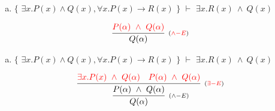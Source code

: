 \documentclass[aspectratio=43]{beamer}
\begin{document}
    \begin{frame}[fragile]
    
    	\begin{enumerate}[d)]
			\item $\{$ $\exists x.P(x)\land Q(x), \forall x.P(x)\to R(x)$ $\}$ $\vdash$ $\exists x.R(x)\ \land\ Q(x) $\\
		\end{enumerate}
        
        \vspace{70pt}
        
        \[
        \begin{array}{c}
		
        	\infer[_{(\textcolor{red}{\land -E})}] 
                	{Q(\alpha)}
                    {\textcolor{red}{P(\alpha)\ \land \ Q(\alpha)}}
		\end{array}
        \]
        
	\end{frame}
    
    \begin{frame}[fragile]
    
    	\begin{enumerate}[d)]
			\item $\{$ $\exists x.P(x)\land Q(x), \forall x.P(x)\to R(x)$ $\}$ $\vdash$ $\exists x.R(x)\ \land\ Q(x) $\\
		\end{enumerate}
        
        \vspace{80pt}
        
        \[
        \begin{array}{c}
		
        	\infer[_{(\land -E)}] 
                	{Q(\alpha)}
                    {\infer[_{(\textcolor{red}{\exists -E})}]
                    	{P(\alpha)\ \land \ Q(\alpha)}
                    	{\textcolor{red}{\exists x.P(x)\ \land \ Q(\alpha)}
                        \hspace{10pt}
                        \textcolor{red}{P(\alpha)\ \land \ Q(\alpha)}
                        }
                    }
		\end{array}
        \]
        
	\end{frame}
    
\end{document}
